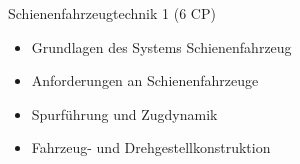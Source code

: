 \documentclass[slidestop,compress,mathserif, aspectratio = 169, 9pt]{beamer}
\begin{document}
{\begin{columns}[t]
     \begin{column}[T]{6cm} 
     Schienenfahrzeugtechnik 1 (6 CP)
     	\begin{itemize}
     	\item Grundlagen des Systems Schienenfahrzeug
	\item Anforderungen an Schienenfahrzeuge
	\item Spurführung und Zugdynamik
	\item Fahrzeug- und Drehgestellkonstruktion
	\end{itemize}
     \end{column}
 \end{columns}
}

\end{document}
